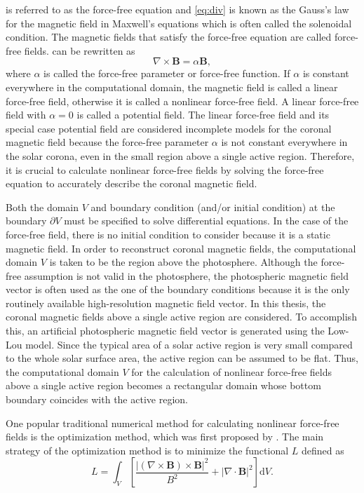  is referred to as the force-free equation and \cref{eq:div} is known as the Gauss's law for the magnetic field in Maxwell's equations which is often called the solenoidal condition. The magnetic fields that satisfy the force-free equation are called force-free fields.  can be rewritten as
\begin{equation*}
    \nabla \times \mathbf{B} = \alpha \mathbf{B},
\end{equation*}
where $\alpha$ is called the force-free parameter or force-free function. If $\alpha$ is constant everywhere in the computational domain, the magnetic field is called a linear force-free field, otherwise it is called a nonlinear force-free field. A linear force-free field with $\alpha = 0$ is called a potential field. The linear force-free field and its special case potential field are considered incomplete models for the coronal magnetic field because the force-free parameter $\alpha$ is not constant everywhere in the solar corona, even in the small region above a single active region. 
Therefore, it is crucial to calculate nonlinear force-free fields by solving the force-free equation to accurately describe the coronal magnetic field.

Both the domain $V$ and boundary condition (and/or initial condition) at the boundary $\partial V$ must be specified to solve differential equations. In the case of the force-free field, there is no initial condition to consider because it is a static magnetic field. In order to reconstruct coronal magnetic fields, the computational domain $V$ is taken to be the region above the photosphere. Although the force-free assumption is not valid in the photosphere, the photospheric magnetic field vector is often used as the one of the boundary conditions because it is the only routinely available high-resolution magnetic field vector. In this thesis, the coronal magnetic fields above a single active region are considered. To accomplish this, an artificial photospheric magnetic field vector is generated using the Low-Lou model. Since the typical area of a solar active region is very small compared to the whole solar surface area, the active region can be assumed to be flat. Thus, the computational domain $V$ for the calculation of nonlinear force-free fields above a single active region becomes a rectangular domain whose bottom boundary coincides with the active region.

One popular traditional numerical method for calculating nonlinear force-free fields is the optimization method, which was first proposed by \parencite{wheatland2000optimization}. The main strategy of the optimization method is to minimize the functional $L$ defined as 
\begin{equation}\label{eq:optL}
    L = \int_V \left[ \frac{|(\nabla \times \mathbf{B})\times \mathbf{B}|^2}{B^2} + |\nabla \cdot \mathbf{B}|^2 \right] \mathrm{d}V.
\end{equation}

